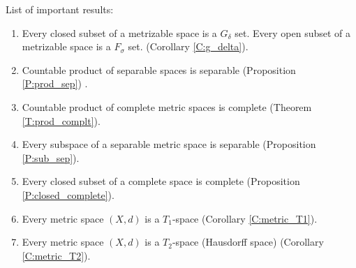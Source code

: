 \newpage
List of important results:
\begin{enumerate}
  \item Every closed subset of a metrizable space is a $G_{\delta}$ set.
        Every open subset of a metrizable space is a $F_{\sigma}$ set.
        (Corollary \ref{C:g_delta}).
  \item Countable product of separable spaces is separable (Proposition
	      \ref{P:prod_sep}) .
  \item	Countable product of complete metric spaces is complete (Theorem 
	      \ref{T:prod_complt}).
  \item Every subspace of a separable metric space is separable (Proposition
	      \ref{P:sub_sep}).
  \item Every closed subset of a complete space is complete (Proposition
	      \ref{P:closed_complete}).
  \item Every metric space $(X,d)$ is a $T_1$-space (Corollary
        \ref{C:metric_T1}).
  \item Every metric space $(X,d)$ is a $T_2$-space (Hausdorff space) (Corollary
        \ref{C:metric_T2}).
\end{enumerate}
